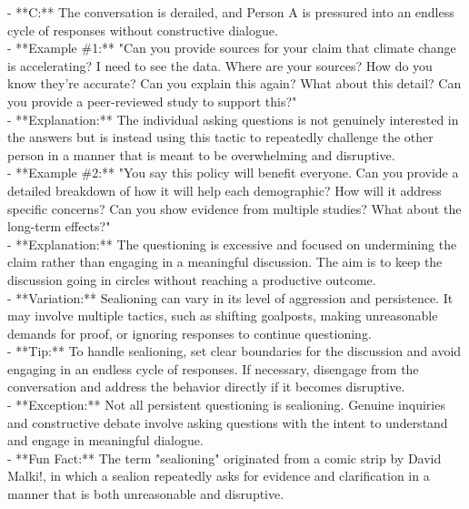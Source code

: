 \documentclass[a4paper,12pt,single,pdftex]{scrbook}
\begin{document}
    
        - **C:** The conversation is derailed, and Person A is pressured into an endless cycle of responses without constructive dialogue.
    \\

    
      - **Example \#1:** "Can you provide sources for your claim that climate change is accelerating? I need to see the data. Where are your sources? How do you know they’re accurate? Can you explain this again? What about this detail? Can you provide a peer-reviewed study to support this?"
    \\

    
      - **Explanation:** The individual asking questions is not genuinely interested in the answers but is instead using this tactic to repeatedly challenge the other person in a manner that is meant to be overwhelming and disruptive.
    \\

    
      - **Example \#2:** "You say this policy will benefit everyone. Can you provide a detailed breakdown of how it will help each demographic? How will it address specific concerns? Can you show evidence from multiple studies? What about the long-term effects?"
    \\

    
      - **Explanation:** The questioning is excessive and focused on undermining the claim rather than engaging in a meaningful discussion. The aim is to keep the discussion going in circles without reaching a productive outcome.
    \\

    
      - **Variation:** Sealioning can vary in its level of aggression and persistence. It may involve multiple tactics, such as shifting goalposts, making unreasonable demands for proof, or ignoring responses to continue questioning.
    \\

    
      - **Tip:** To handle sealioning, set clear boundaries for the discussion and avoid engaging in an endless cycle of responses. If necessary, disengage from the conversation and address the behavior directly if it becomes disruptive.
    \\

    
      - **Exception:** Not all persistent questioning is sealioning. Genuine inquiries and constructive debate involve asking questions with the intent to understand and engage in meaningful dialogue.
    \\

    
      - **Fun Fact:** The term "sealioning" originated from a comic strip by David Malki!, in which a sealion repeatedly asks for evidence and clarification in a manner that is both unreasonable and disruptive.
    \\
\end{document}
